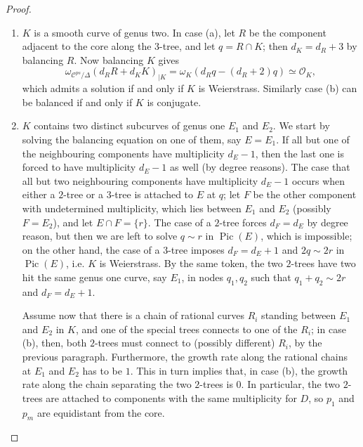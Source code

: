 \documentclass[11pt]{amsart}
\newcommand{\OO}{\mathcal O}
\newcommand{\dvr}{\Delta}
\newcommand{\Pic}{\operatorname{Pic}}
\theoremstyle{plain}
\theoremstyle{definition}
\begin{document}
\begin{proof}
\begin{enumerate}[leftmargin=.6cm]
 \item $K$ is a smooth curve of genus two. In case (a), let $R$ be the component adjacent to the core along the $3$-tree, and let $q=R\cap K$; then $d_K=d_R+3$ by balancing $R$. Now balancing $K$ gives \[\omega_{\mathcal C^{ps}/\dvr}(d_RR+d_KK)_{|K}=\omega_K(d_Rq-(d_R+2)q)\simeq\OO_K,\]
 which admits a solution if and only if $K$ is Weierstrass. Similarly case (b) can be balanced if and only if $K$ is conjugate.
 
 \item $K$ contains two distinct subcurves of genus one $E_1$ and $E_2$. We start by solving the balancing equation on one of them, say $E=E_1$. %
 If all but one of the neighbouring components have multiplicity $d_E-1$, then the last one is forced to have multiplicity $d_E-1$ as well (by degree reasons). The case that all but two neighbouring components have multiplicity $d_E-1$ occurs when either a $2$-tree or a $3$-tree is attached to $E$ at $q$; let $F$ be the other component with undetermined multiplicity, which lies between $E_1$ and $E_2$ (possibly $F=E_2$), and let $E\cap F=\{r\}$. The case of a $2$-tree forces $d_F=d_E$ by degree reason, but then we are left to solve $q\sim r$ in $\Pic(E)$, which is impossible; on the other hand, the case of a $3$-tree imposes $d_F=d_E+1$ and $2q\sim 2r$ in $\Pic(E)$, i.e. $K$ is Weierstrass. By the same token, the two $2$-trees have two hit the same genus one curve, say $E_1$, in nodes $q_1,q_2$ such that $q_1+q_2\sim 2r$ and $d_F=d_E+1$.
 
 Assume now that there is a chain of rational curves $R_i$ standing between $E_1$ and $E_2$ in $K$, and one of the special trees connects to one of the $R_i$; in case (b), then, both $2$-trees must connect to (possibly different) $R_i$, by the previous paragraph. Furthermore, the growth rate along the rational chains at $E_1$ and $E_2$ has to be $1$. This in turn implies that, in case (b), the growth rate along the chain separating the two $2$-trees is $0$. In particular, the two $2$-trees are attached to components with the same multiplicity for $D$, so $p_1$ and $p_m$ are equidistant from the core.
 

\end{enumerate}
\end{proof}
\end{document}
